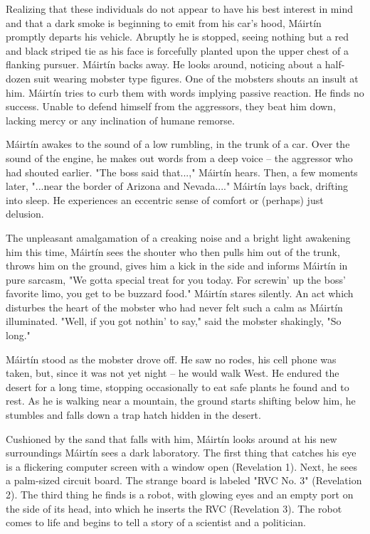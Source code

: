 \documentclass[12pt]{article}
\newcommand{\mcs}{M\'airt\'in }
\begin{document}
\begin{flushleft}
Realizing that these individuals do not appear to have his best interest in mind and that a
dark smoke is beginning to emit from his car's hood, \mcs promptly departs his vehicle.
Abruptly he is stopped, seeing nothing but a red and
black striped tie as his face is forcefully planted upon the upper chest of a flanking pursuer. 
\mcs backs away. He looks
around, noticing about a half-dozen suit wearing mobster type figures. One of the mobsters shouts an insult
at him.
\mcs tries to curb them with words
implying passive reaction. He finds no success. Unable to defend himself from the aggressors,
they beat him down, lacking mercy or any inclination of humane remorse.

\mcs awakes to the sound of a low rumbling, in the trunk of a car.
Over the sound of the engine, he makes out words from a deep voice -- the 
aggressor who had shouted earlier. "The boss said that...," \mcs hears. Then, a few moments later, "...near
the border of Arizona and Nevada...." \mcs lays back, drifting 
into sleep. He experiences an eccentric sense of comfort or (perhaps) just delusion. 

The unpleasant amalgamation of a creaking noise and a bright light awakening him this time, \mcs sees
the shouter who then pulls him out of the trunk, throws him on the ground, gives him a kick in the
side and informs \mcs in pure sarcasm, "We gotta special treat for you today. For screwin'
up the boss' favorite limo, you get to be buzzard food." \mcs stares silently. An act which disturbes the heart of
the mobster who had never felt such a calm as \mcs illuminated. "Well, if you got nothin' to say," said the mobster 
shakingly, "So long."

\mcs stood as the mobster drove off. He saw no rodes, his cell phone was taken, but,
since it was not yet night -- he would walk West. He endured the desert for a long time, stopping
occasionally to eat safe plants he found and to rest. As he is walking near a mountain, the ground starts
shifting below him, he stumbles and falls down a trap hatch hidden in the desert.

Cushioned by the sand that falls with him, \mcs looks around at his new surroundings \mcs sees
a dark laboratory. The first thing that catches his eye is a flickering computer screen with a window open (Revelation 1). Next,
he sees a palm-sized circuit board. The strange board is labeled "RVC No. 3" (Revelation 2). The third
thing he finds is a robot, with glowing eyes and an empty port on the side of its head, into which he inserts the RVC
(Revelation 3).
The robot comes to life and begins to tell a story of a scientist and a politician.


\end{flushleft}
\end{document}
